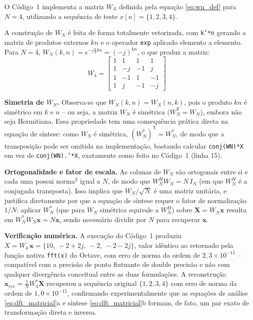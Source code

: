 \documentclass[tcc]{classe_uftex/uftex}
\begin{document}
O Código~1 implementa a matriz $W_N$ definida pela equação \eqref{eq:wn_def} para $N=4$, utilizando a sequência de teste $x[n] = \{1,2,3,4\}$.



A construção de $W_N$ é feita de forma totalmente vetorizada, com \texttt{k'*n} gerando a matriz de produtos externos $kn$ e o operador \texttt{exp} aplicado elemento a elemento. Para $N=4$, $W_N(k,n) = e^{-j\frac{\pi}{2}kn} = (-j)^{kn}$, o que produz a matriz:
\begin{equation}
  W_4 = \begin{bmatrix}
    1 & 1 & 1 & 1 \\
    1 & -j & -1 & j \\
    1 & -1 & 1 & -1 \\
    1 & j & -1 & -j
  \end{bmatrix} \nonumber
\end{equation}

\textbf{Simetria de $W_N$.} Observa-se que $W_N(k,n) = W_N(n,k)$, pois o produto $kn$ é simétrico em $k$ e $n$ -- ou seja, a matriz $W_N$ é simétrica ($W_N^{\mathsf{T}} = W_N$), embora não seja Hermitiana. Essa propriedade tem uma consequência prática direta na equação de síntese: como $W_N$ é simétrica, $(W_N^{*})^{\mathsf{T}} = W_N^{*}$, de modo que a transposição pode ser omitida na implementação, bastando calcular \texttt{conj(WN)*X} em vez de \texttt{conj(WN).'*X}, exatamente como feito no Código~1 (linha 15).

\textbf{Ortogonalidade e fator de escala.} As colunas de $W_N$ são ortogonais entre si e cada uma possui norma$^2$ igual a $N$, de modo que $W_N^{H}W_N = N\,I_N$ (em que $W_N^H$ é a conjugada transposta). Isso implica que $W_N/\sqrt{N}$ é uma matriz unitária, e justifica diretamente por que a equação de síntese requer o fator de normalização $1/N$: aplicar $W_N^{*}$ (que para $W_N$ simétrica equivale a $W_N^H$) sobre $\mathbf{X} = W_N\mathbf{x}$ resulta em $W_N^{*}W_N\mathbf{x} = N\mathbf{x}$, sendo necessário dividir por $N$ para recuperar $\mathbf{x}$.

\textbf{Verificação numérica.} A execução do Código~1 produziu $X = W_4\,\mathbf{x} = \{10,\ -2+2j,\ -2,\ -2-2j\}$, valor idêntico ao retornado pela função nativa \texttt{fft(x)} do Octave, com erro de norma da ordem de $2{,}3\times10^{-15}$ -- compatível com a precisão de ponto flutuante de double precisão e não com qualquer divergência conceitual entre as duas formulações. A reconstrução $\mathbf{x}_{rec} = \frac{1}{N}W_4^{*}\mathbf{X}$ recuperou a sequência original $\{1,2,3,4\}$ com erro de norma da ordem de $1{,}0\times10^{-15}$, confirmando experimentalmente que as equações de análise \eqref{eq:dft_matricial}a e síntese \eqref{eq:dft_matricial}b formam, de fato, um par exato de transformação direta e inversa.
\end{document}

